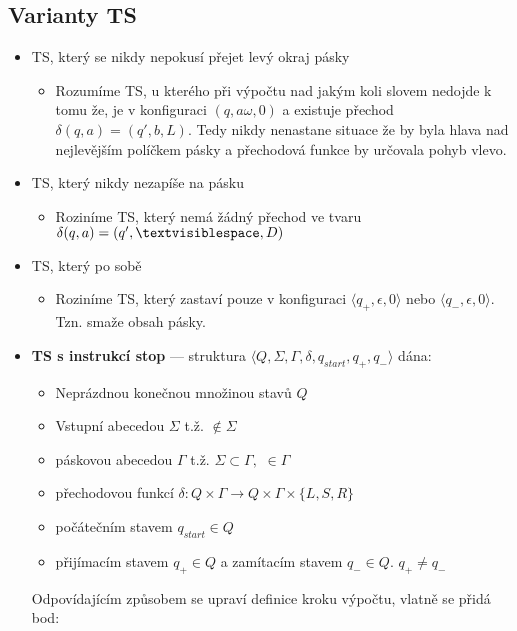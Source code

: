 \documentclass[10pt,a4paper]{article}
\begin{document}
	\subsection{Varianty TS}
		\begin{itemize}
			\item TS, který se nikdy nepokusí přejet levý okraj pásky
				\begin{itemize}
					\item Rozumíme TS, u kterého při výpočtu nad jakým koli slovem nedojde k tomu že, je v konfiguraci 
						$(q,a\omega,0)$ a existuje přechod $\delta(q,a) = (q',b,L).$  Tedy nikdy nenastane situace
						že by byla hlava nad nejlevějším políčkem pásky a přechodová funkce by určovala pohyb 								vlevo.
				\end{itemize}
			\item TS, který nikdy nezapíše na pásku \textvisiblespace
				\begin{itemize}
					\item Roziníme TS, který nemá žádný přechod ve tvaru $\delta(q,a) = (q',\textvisiblespace,D)$
				\end{itemize}
			\item TS, který po sobě 
				\begin{itemize}
					\item Roziníme TS, který zastaví pouze v konfiguraci $\langle q_{+}, \epsilon, 0 \rangle$
						nebo $\langle q_{-}, \epsilon, 0 \rangle$. Tzn. smaže obsah pásky.
				\end{itemize}
			\item \textbf{TS s instrukcí stop} --- struktura  $\langle Q, \Sigma, \Gamma, \delta, q_{start}, q_{+}, q_{-} \rangle $
								dána:
				\begin{itemize}
					\item Neprázdnou konečnou množinou stavů $Q$
					\item Vstupní abecedou  $\Sigma$ t.ž. \textvisiblespace $ \notin \Sigma$
					\item páskovou abecedou $\Gamma$ t.ž. $\Sigma \subset \Gamma,$ \textvisiblespace $\in  \Gamma $
					\item přechodovou funkcí $\delta : Q \times  \Gamma \rightarrow Q \times \Gamma \times \{L, S, R \} $
					\item počátečním stavem $q_{start} \in Q$
					\item přijímacím stavem $q_{+} \in Q $ a zamítacím stavem $q_{-} \in Q.$ $q_{+} \neq q_{-}$
				\end{itemize}
				Odpovídajícím způsobem se upraví definice kroku výpočtu, vlatně se přidá bod: 


\end{itemize}
\end{document}
